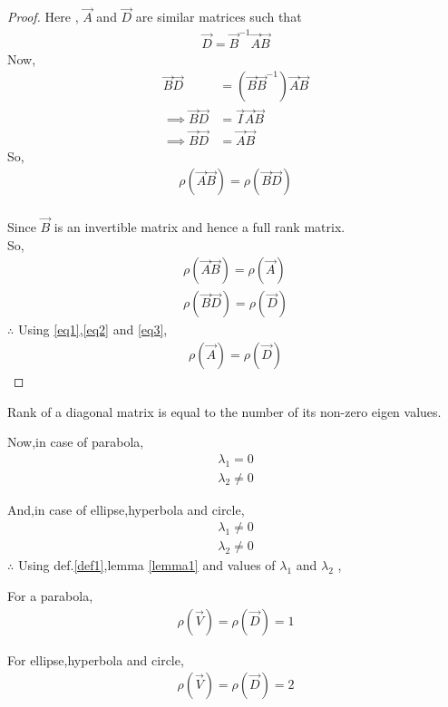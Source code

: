 \documentclass[journal,12pt,twocolumn]{IEEEtran}
\begin{document}
\begin{proof}
Here , $\vec{A}$ and $\vec{D}$ are similar matrices such that 
\begin{align}
    \vec{D} = \vec{B}^{-1}\vec{A}\vec{B}
\end{align}
Now,
\begin{align}
    \vec{B}\vec{D} &= (\vec{B}\vec{B}^{-1})\vec{A}\vec{B}
    \\
    \implies \vec{B}\vec{D} &= \vec{I}\vec{A}\vec{B}
    \\
    \implies \vec{B}\vec{D} &= \vec{A}\vec{B}
\end{align}
So,
\begin{align}
    \rho(\vec{A}\vec{B}) = \rho(\vec{B}\vec{D}) \label{eq1}
\end{align}
\\
Since $\vec{B}$ is an invertible matrix and hence a full rank matrix.
\\
So,
\begin{align}
    \rho(\vec{A}\vec{B}) = \rho(\vec{A}) \label{eq2}
    \\
    \rho(\vec{B}\vec{D}) = \rho(\vec{D}) \label{eq3}
\end{align}
$\therefore$ Using \eqref{eq1},\eqref{eq2} and \eqref{eq3},
\begin{align}
    \rho(\vec{A}) = \rho(\vec{D})
\end{align}
\end{proof}

\begin{definition}
Rank of a diagonal matrix is equal to the number of its non-zero eigen values. \label{def1}
\end{definition}

Now,in case of parabola, 
\begin{align}
    \lambda_1 =0 
    \\
    \lambda_2 \neq 0 
\end{align}

And,in case of ellipse,hyperbola and circle, \label{result2}
\begin{align}
    \lambda_1 \neq 0 
    \\
    \lambda_2 \neq 0 
\end{align}
$\therefore$
Using def.\ref{def1},lemma \ref{lemma1} and values of $\lambda_1$ and $\lambda_2$ ,

For a parabola,
\begin{align}
    \rho(\vec{V}) = \rho(\vec{D}) = 1
\end{align}

For ellipse,hyperbola and circle,
\begin{align}
    \rho(\vec{V}) = \rho(\vec{D}) = 2
\end{align}
\end{document}

